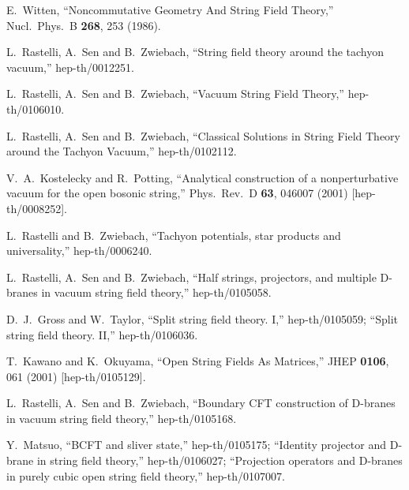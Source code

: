 \documentclass[a4paper,12pt]{article}
\begin{document}
\begin{thebibliography}{999}
\parskip=-3pt
E.~Witten,
``Noncommutative Geometry And String Field Theory,''
Nucl.\ Phys.\ B {\bf 268}, 253 (1986).

L.~Rastelli, A.~Sen and B.~Zwiebach,
``String field theory around the tachyon vacuum,''
hep-th/0012251.

L.~Rastelli, A.~Sen and B.~Zwiebach,
``Vacuum String Field Theory,''
hep-th/0106010.

L.~Rastelli, A.~Sen and B.~Zwiebach,
``Classical Solutions in String Field Theory around the Tachyon Vacuum,''
hep-th/0102112.

V.~A.~Kostelecky and R.~Potting,
``Analytical construction of a nonperturbative vacuum 
for the open  bosonic string,''
Phys.\ Rev.\ D {\bf 63}, 046007 (2001)
[hep-th/0008252].

L.~Rastelli and B.~Zwiebach,
``Tachyon potentials, star products and universality,''
hep-th/0006240.

L.~Rastelli, A.~Sen and B.~Zwiebach,
``Half strings, projectors, and multiple D-branes in 
vacuum string field  theory,''
hep-th/0105058.

D.~J.~Gross and W.~Taylor,
``Split string field theory. I,''
hep-th/0105059;
``Split string field theory. II,''
hep-th/0106036.

T.~Kawano and K.~Okuyama,
``Open String Fields As Matrices,''
JHEP {\bf 0106}, 061 (2001) [hep-th/0105129].




L.~Rastelli, A.~Sen and B.~Zwiebach,
``Boundary CFT construction of D-branes in vacuum string field theory,''
hep-th/0105168.



Y.~Matsuo,
``BCFT and sliver state,''
hep-th/0105175;
``Identity projector and D-brane in string field theory,''
hep-th/0106027;
``Projection operators and D-branes in 
purely cubic open string field  theory,''
hep-th/0107007.


\end{thebibliography}
\end{document}
